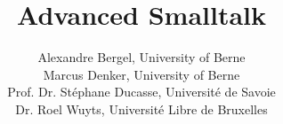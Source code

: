 \let\wholebook=\relax


\title{Advanced Smalltalk}
\author{
Alexandre Bergel, University of Berne  \\
Marcus Denker, University of Berne \\
Prof. Dr. St\'ephane Ducasse, Universit\'e de Savoie  \\
Dr. Roel Wuyts, Universit\'e Libre de Bruxelles \\
}


\maketitle








